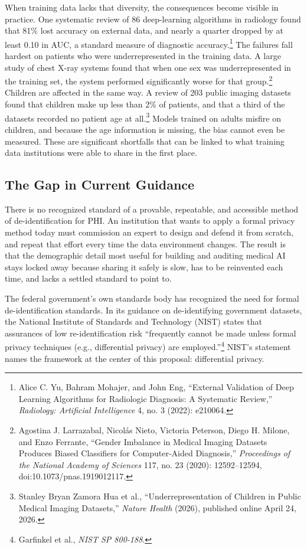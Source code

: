 \documentclass[11pt]{article}
\begin{document}
When training data lacks that diversity, the consequences become visible in practice. One systematic review of 86 deep-learning algorithms in radiology found that 81\% lost accuracy on external data, and nearly a quarter dropped by at least 0.10 in AUC, a standard measure of diagnostic accuracy.\footnote{Alice C. Yu, Bahram Mohajer, and John Eng, ``External Validation of Deep Learning Algorithms for Radiologic Diagnosis: A Systematic Review,'' \textit{Radiology: Artificial Intelligence} 4, no. 3 (2022): e210064.} The failures fall hardest on patients who were underrepresented in the training data. A large study of chest X-ray systems found that when one sex was underrepresented in the training set, the system performed significantly worse for that group.\footnote{Agostina J. Larrazabal, Nicol\'as Nieto, Victoria Peterson, Diego H. Milone, and Enzo Ferrante, ``Gender Imbalance in Medical Imaging Datasets Produces Biased Classifiers for Computer-Aided Diagnosis,'' \textit{Proceedings of the National Academy of Sciences} 117, no. 23 (2020): 12592--12594, doi:10.1073/pnas.1919012117.} Children are affected in the same way. A review of 203 public imaging datasets found that children make up less than 2\% of patients, and that a third of the datasets recorded no patient age at all.\footnote{Stanley Bryan Zamora Hua et al., ``Underrepresentation of Children in Public Medical Imaging Datasets,'' \textit{Nature Health} (2026), published online April 24, 2026.} Models trained on adults misfire on children, and because the age information is missing, the bias cannot even be measured. These are significant shortfalls that can be linked to what training data institutions were able to share in the first place.

\subsection{The Gap in Current Guidance}\label{sec:gap}

There is no recognized standard of a provable, repeatable, and accessible method of de-identification for PHI. An institution that wants to apply a formal privacy method today must commission an expert to design and defend it from scratch, and repeat that effort every time the data environment changes. The result is that the demographic detail most useful for building and auditing medical AI stays locked away because sharing it safely is slow, has to be reinvented each time, and lacks a settled standard to point to.

The federal government's own standards body has recognized the need for formal de-identification standards. In its guidance on de-identifying government datasets, the National Institute of Standards and Technology (NIST) states that assurances of low re-identification risk ``frequently cannot be made unless formal privacy techniques (e.g., differential privacy) are employed.''\footnote{Garfinkel et al., \textit{NIST SP 800-188}.} NIST's statement names the framework at the center of this proposal: differential privacy.
\end{document}
